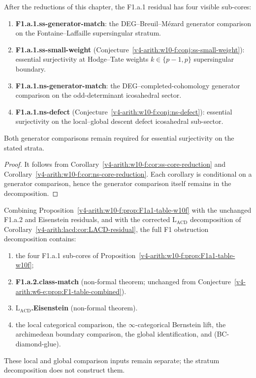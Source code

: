 \begin{proposition}
\label{v4-arith:w10-f:prop:F1a1-table-w10f}
After the reductions of this chapter, the
F1.a.1 residual has four visible sub-cores:
\begin{enumerate}
\item \textbf{F1.a.1.ss-generator-match}: the DEG--Breuil--M{\'e}zard
generator comparison on the Fontaine--Laffaille supersingular stratum.
\item \textbf{F1.a.1.ss-small-weight}
(Conjecture~\ref{v4-arith:w10-f:conj:ss-small-weight}): essential surjectivity
at Hodge--Tate weights \(k\in\{p-1,p\}\) supersingular boundary.
\item \textbf{F1.a.1.ns-generator-match}: the DEG--completed-cohomology
generator comparison on the odd-determinant icosahedral sector.
\item \textbf{F1.a.1.ns-defect}
(Conjecture~\ref{v4-arith:w10-f:conj:ns-defect}): essential surjectivity on
the local--global descent defect icosahedral sub-sector.
\end{enumerate}
Both generator comparisons remain required for essential
surjectivity on the stated strata.
\end{proposition}

\begin{proof}
It follows from Corollary~\ref{v4-arith:w10-f:cor:ss-core-reduction} and
Corollary~\ref{v4-arith:w10-f:cor:ns-core-reduction}. Each corollary is
conditional on a generator comparison, hence the generator comparison
itself remains in the decomposition.
\end{proof}

\begin{proposition}
\label{v4-arith:w10-f:prop:F1-table-w10f}
Combining
Proposition~\ref{v4-arith:w10-f:prop:F1a1-table-w10f} with the unchanged
F1.a.2 and Eisenstein residuals, and with the corrected
\(\mathrm{L}_{\mathrm{ACD}}\) decomposition of
Corollary~\ref{v4-arith:lacd:cor:LACD-residual}, the full F1 obstruction decomposition
contains:
\begin{enumerate}
\item the four F1.a.1 sub-cores of
Proposition~\ref{v4-arith:w10-f:prop:F1a1-table-w10f};
\item \textbf{F1.a.2.class-match} (non-formal theorem; unchanged from
Conjecture~\ref{v4-arith:w6-e:prop:F1-table-combined}).
\item \textbf{\(\mathrm{L}_{\mathrm{ACD}}\).Eisenstein} (non-formal theorem).
\item the local categorical comparison, the \(\infty\)-categorical
Bernstein lift, the archimedean boundary comparison, the global
identification, and (BC-diamond-glue).
\end{enumerate}
These local and global comparison inputs remain separate; the
stratum decomposition does not construct them.
\end{proposition}

